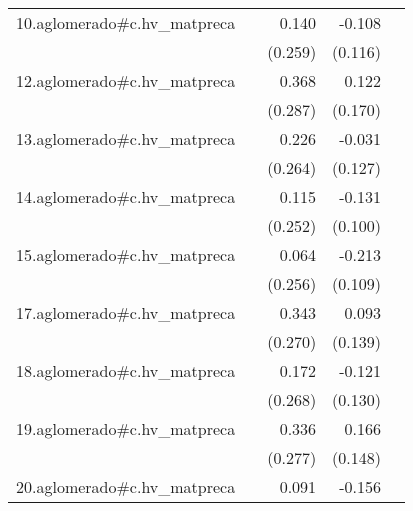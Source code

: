 {\begin{longtable}{l*{4}{D{.}{.}{-1}}}
\addlinespace
10.aglomerado#c.hv\_matpreca&                     &       0.140         &      -0.108         &                     \\
            &                     &     (0.259)         &     (0.116)         &                     \\
\addlinespace
12.aglomerado#c.hv\_matpreca&                     &       0.368         &       0.122         &                     \\
            &                     &     (0.287)         &     (0.170)         &                     \\
\addlinespace
13.aglomerado#c.hv\_matpreca&                     &       0.226         &      -0.031         &                     \\
            &                     &     (0.264)         &     (0.127)         &                     \\
\addlinespace
14.aglomerado#c.hv\_matpreca&                     &       0.115         &      -0.131         &                     \\
            &                     &     (0.252)         &     (0.100)         &                     \\
\addlinespace
15.aglomerado#c.hv\_matpreca&                     &       0.064         &      -0.213         &                     \\
            &                     &     (0.256)         &     (0.109)         &                     \\
\addlinespace
17.aglomerado#c.hv\_matpreca&                     &       0.343         &       0.093         &                     \\
            &                     &     (0.270)         &     (0.139)         &                     \\
\addlinespace
18.aglomerado#c.hv\_matpreca&                     &       0.172         &      -0.121         &                     \\
            &                     &     (0.268)         &     (0.130)         &                     \\
\addlinespace
19.aglomerado#c.hv\_matpreca&                     &       0.336         &       0.166         &                     \\
            &                     &     (0.277)         &     (0.148)         &                     \\
\addlinespace
20.aglomerado#c.hv\_matpreca&                     &       0.091         &      -0.156         &                     \\

\end{longtable}}
